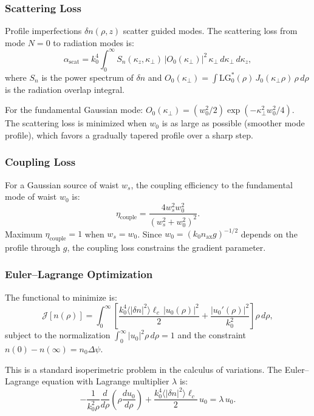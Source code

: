 \documentclass[journal,twocolumn]{IEEEtran}
\newcommand{\LG}{\mathrm{LG}}
\begin{document}
\subsubsection{Scattering Loss}

Profile imperfections $\delta n(\rho,z)$ scatter guided modes. The
scattering loss from mode $N=0$ to radiation modes is:
\begin{equation}
\alpha_\text{scat}
= k_0^4 \int_0^\infty S_n(\kappa_z, \kappa_\perp)\,
|O_0(\kappa_\perp)|^2\,\kappa_\perp\,d\kappa_\perp\,d\kappa_z,
\end{equation}
where $S_n$ is the power spectrum of $\delta n$ and
$O_0(\kappa_\perp) = \int \LG_0^*(\rho)\,J_0(\kappa_\perp\rho)\,\rho\,d\rho$
is the radiation overlap integral.

For the fundamental Gaussian mode:
$O_0(\kappa_\perp) = (w_0^2/2)\exp(-\kappa_\perp^2 w_0^2/4)$.
The scattering loss is minimized when $w_0$ is as large as possible
(smoother mode profile), which favors a gradually tapered profile
over a sharp step.

\subsubsection{Coupling Loss}

For a Gaussian source of waist $w_s$, the coupling efficiency to the
fundamental mode of waist $w_0$ is:
\begin{equation}
\eta_\text{couple} = \frac{4w_s^2 w_0^2}{(w_s^2 + w_0^2)^2}.
\label{eq:coupling_eff}
\end{equation}
Maximum $\eta_\text{couple} = 1$ when $w_s = w_0$. Since
$w_0 = (k_0 n_\text{ax} g)^{-1/2}$ depends on the profile through $g$,
the coupling loss constrains the gradient parameter.

\subsubsection{Euler--Lagrange Optimization}

The functional to minimize is:
\begin{equation}
\mathcal{J}[n(\rho)] = \int_0^\infty
\left[\frac{k_0^4\langle|\delta n|^2\rangle\ell_c\,|u_0(\rho)|^2}{2}
+ \frac{|u_0'(\rho)|^2}{k_0^2}\right]\rho\,d\rho,
\end{equation}
subject to the normalization $\int_0^\infty |u_0|^2\rho\,d\rho = 1$
and the constraint $n(0) - n(\infty) = n_0\Delta\psi$.

This is a standard isoperimetric problem in the calculus of variations.
The Euler--Lagrange equation with Lagrange multiplier $\lambda$ is:
\begin{equation}
-\frac{1}{k_0^2\rho}\frac{d}{d\rho}\left(\rho\frac{du_0}{d\rho}\right)
+ \frac{k_0^4\langle|\delta n|^2\rangle\ell_c}{2}\,u_0
= \lambda\,u_0.
\end{equation}
\end{document}
